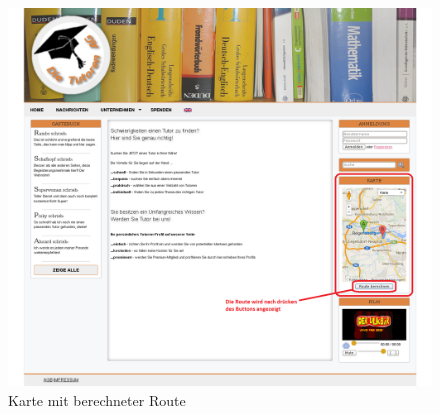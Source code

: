 \begin{figure}[!htbp]
 \centering
 \includegraphics[width=1\textwidth]{../Screenshots/Karte_route}
 \caption{Karte mit berechneter Route}
 \label{fig:Karte_route}
\end{figure}
